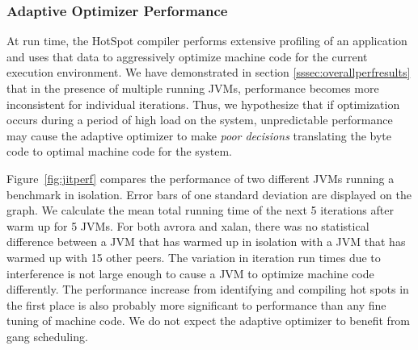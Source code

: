 \documentclass{sig-alternate}
\begin{document}
\begin{figure*}
\centering
{}
\caption{GC run time slowdown relative to 1 JVM.}
\label{fig:gcperf}
\end{figure*}

\subsubsection{Adaptive Optimizer Performance}
\begin{figure*}
\centering
{}
\caption{Mean total run time of JVMs warmed up in isolation and with 16 running JVMs in parallel.}
\label{fig:jitperf}
\end{figure*}

At run time, the HotSpot compiler performs extensive profiling of an application and uses that data to aggressively optimize machine code for the current execution environment\cite{hotspot:whitepaper}. We have demonstrated in section \ref{sssec:overallperfresults} that in the presence of multiple running JVMs, performance becomes more inconsistent for individual iterations. Thus, we hypothesize that if optimization occurs during a period of high load on the system, unpredictable performance may cause the adaptive optimizer to make \textit{poor decisions} translating the byte code to optimal machine code for the system.

Figure~\ref{fig:jitperf} compares the performance of two different JVMs running a benchmark in isolation. Error bars of one standard deviation are displayed on the graph. We calculate the mean total running time of the next 5 iterations after warm up for 5 JVMs. For both avrora and xalan, there was no statistical difference between a JVM that has warmed up in isolation with a JVM that has warmed up with 15 other peers. The variation in iteration run times due to interference is not large enough to cause a JVM to optimize machine code differently. The performance increase from identifying and compiling hot spots in the first place is also probably more significant to performance than any fine tuning of machine code. We do not expect the adaptive optimizer to benefit from gang scheduling.


%
%
\end{document}
